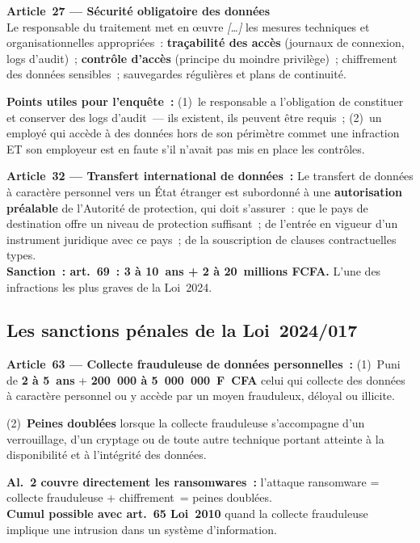 \begin{boxjuris}
\textbf{Article~27 --- Sécurité obligatoire des données}\\
Le responsable du traitement met en \oe uvre \textit{[\ldots]} les mesures
techniques et organisationnelles appropriées~: \textbf{traçabilité des accès}
(journaux de connexion, logs d'audit)~; \textbf{contrôle d'accès}
(principe du moindre privilège)~; chiffrement des données sensibles~;
sauvegardes régulières et plans de continuité.

\textbf{Points utiles pour l'enquête~:} (1)~le responsable a l'obligation
de constituer et conserver des logs d'audit~--- ils existent, ils peuvent
être requis~; (2)~un employé qui accède à des données hors de son périmètre
commet une infraction ET son employeur est en faute s'il n'avait pas mis
en place les contrôles.
\end{boxjuris}

\begin{boxjuris}
\textbf{Article~32 --- Transfert international de données~:}
Le transfert de données à caractère personnel vers un État étranger
est subordonné à une \textbf{autorisation préalable} de l'Autorité
de protection, qui doit s'assurer~: que le pays de destination offre
un niveau de protection suffisant~; de l'entrée en vigueur d'un instrument
juridique avec ce pays~; de la souscription de clauses contractuelles types.\\[0.3ex]
\textbf{Sanction~: art.~69~: 3 à 10~ans + 2 à 20~millions FCFA.}
L'une des infractions les plus graves de la Loi~2024.
\end{boxjuris}

\subsection{Les sanctions pénales de la Loi~2024/017}

\begin{boxjuris}
\textbf{Article~63 --- Collecte frauduleuse de données personnelles~:}
(1)~Puni de \textbf{2 à 5~ans} + \textbf{200~000 à 5~000~000~F~CFA}
celui qui collecte des données à caractère personnel ou y accède par
un moyen frauduleux, déloyal ou illicite.

(2)~\textbf{Peines doublées} lorsque la collecte frauduleuse s'accompagne
d'un verrouillage, d'un cryptage ou de toute autre technique portant atteinte
à la disponibilité et à l'intégrité des données.

\textbf{Al.~2 couvre directement les ransomwares~:} l'attaque ransomware
= collecte frauduleuse + chiffrement~= peines doublées.\\[0.3ex]
\textbf{Cumul possible avec art.~65 Loi~2010} quand la collecte frauduleuse
implique une intrusion dans un système d'information.
\end{boxjuris}

